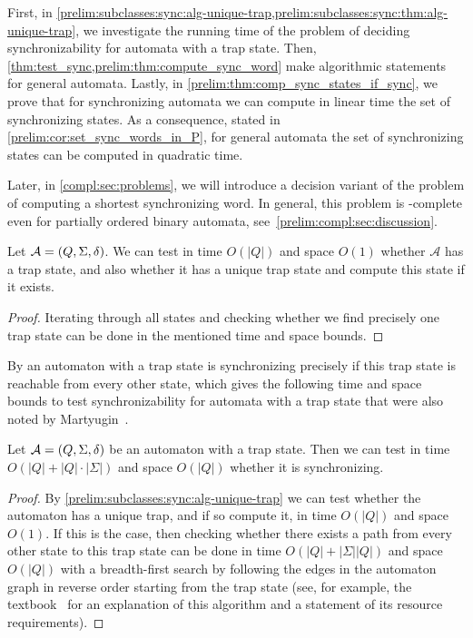 
First, in \cref{prelim:subclasses:sync:alg-unique-trap,prelim:subclasses:sync:thm:alg-unique-trap},
we investigate the running time of the problem of deciding synchronizability for automata with a trap state.
Then, \cref{thm:test_sync,prelim:thm:compute_sync_word}
make algorithmic statements for general automata. 
Lastly, in \cref{prelim:thm:comp_sync_states_if_sync},
we prove that for synchronizing automata
we can compute in linear time the set of synchronizing
states. As a consequence, stated in \cref{prelim:cor:set_sync_words_in_P},
for general automata the set of synchronizing states can be computed in quadratic time.

Later, in \cref{compl:sec:problems}, we will introduce a decision variant of the problem of computing a shortest synchronizing word.
In general, this problem is \NP-complete even for partially ordered binary automata, see~\cref{prelim:compl:sec:discussion}.

\begin{proposition}\label{prelim:subclasses:sync:alg-unique-trap}
	Let $\mathcal A = (Q, \Sigma, \delta)$.
	We can test in time $O(|Q|)$ and space $O(1)$
	whether $\mathcal A$ has a trap state, and also whether it has a unique trap state
	and compute this state if it exists.
\end{proposition}
\begin{proof}
	Iterating through all states and checking whether
	we find precisely one trap state can be done in the mentioned time and space bounds.
\end{proof} 

By  
an automaton with a trap state
is synchronizing precisely if this trap state is reachable
from every other state, which gives the following time and space bounds
to test synchronizability for automata with a trap state
that were also noted by Martyugin~\cite[Prop.~3.2]{Mar2009b}.

\begin{theorem}\label{prelim:subclasses:sync:thm:alg-unique-trap}
	Let $\mathcal A = (Q, \Sigma, \delta)$ 
	be an automaton with a trap state.
	Then we can test in time $O(|Q| + |Q|\cdot |\Sigma|)$
	and space $O(|Q|)$ whether it is synchronizing.
\end{theorem} 
\begin{proof}
	By \cref{prelim:subclasses:sync:alg-unique-trap} 
	we can test whether the automaton has a unique trap, and if so compute it, in time $O(|Q|)$ and space $O(1)$.
	If this is the case, then checking whether there exists a path from every other state
	to this trap state can be done in time $O(|Q| + |\Sigma||Q|)$
	and space $O(|Q|)$ with a breadth-first search
	by following the edges in the automaton graph 
	in reverse order starting from the trap state (see, for example, the textbook~\cite{cormen01introduction} for an explanation of this algorithm
	and a statement of its resource requirements).	
\end{proof}

